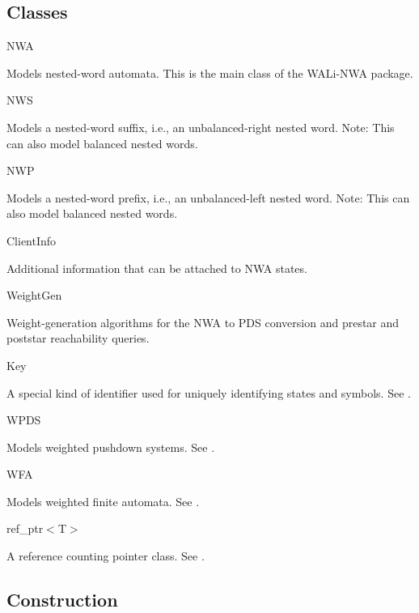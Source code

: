 \documentclass{llncs}
\begin{document}
\subsection{Classes}
\label{Se:Classes}

\begin{description}

\item NWA

  Models nested-word automata.  This is the main class of the WALi-NWA package.

\item NWS

  Models a nested-word suffix, i.e., an unbalanced-right nested word.  Note: This can also model balanced nested words.

\item NWP

  Models a nested-word prefix, i.e., an unbalanced-left nested word.  Note: This can also model balanced nested words.

\item ClientInfo

  Additional information that can be attached to NWA states.

\item WeightGen

  Weight-generation algorithms for the NWA to PDS conversion and prestar and poststar reachability queries.

\item Key

  A special kind of identifier used for uniquely identifying states and symbols.  See \cite{wali}.

\item WPDS

  Models weighted pushdown systems.  See \cite{wali}.

\item WFA

  Models weighted finite automata.  See \cite{wali}.

\item ref\_ptr$<$T$>$

  A reference counting pointer class.  See \cite{wali}. \\

\end{description}


\subsection{Construction}
\label{Se:Construction}
\end{document}
